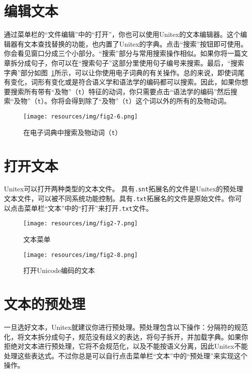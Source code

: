 \section{编辑文本}
通过菜单栏的“文件编辑”中的“打开”，你也可以使用Unitex的文本编辑器。这个编辑器有文本查找替换的功能，也内置了Unitex的字典。点击“搜索”按钮即可使用。你会看见窗口分成三个小部分。“搜索”部分与常用搜索操作相似。如果你将一篇文章拆分成句子，你可以在“搜索句子”这部分里使用句子编号来搜索。最后，“搜索字典”部分如图~\ref{dictionary-search}所示，可以让你使用电子词典的有关操作。总的来说，即使词尾有变化，词形有变化或是符合语义学和语法学的编码都可以搜索。因此，如果你想要搜索所有带有“及物”（\verb$t$）特征的动词，你只需要点击“语法学的编码”然后搜索“及物”（\verb$t$）。你将会得到除了“及物”（\verb$t$）这个词以外的所有的及物动词。


\begin{figure}[!h]
\begin{center}
\texttt{[image: resources/img/fig2-6.png]}
\caption{在电子词典中搜索及物动词（\texttt{t}）\label{dictionary-search}}
\end{center}
\end{figure}


\section{打开文本}
\noindent Unitex可以打开两种类型的文本文件。 
具有\verb+.snt+拓展名的文件是Unitex的预处理文本文件，可以被不同系统功能控制。具有\verb+.txt+拓展名的文件是原始文件。你可以点击菜单栏“文本”中的“打开”来打开\verb+.txt+文件。


\begin{figure}[!h]
\begin{center}
\texttt{[image: resources/img/fig2-7.png]}
\caption{文本菜单}
\end{center}
\end{figure}

\begin{figure}[!h]
\begin{center}
\texttt{[image: resources/img/fig2-8.png]}
\caption{打开Unicode编码的文本}
\end{center}
\end{figure}



\section{文本的预处理}
\noindent 一旦选好文本，Unitex就建议你进行预处理。预处理包含以下操作：分隔符的规范化，将文本拆分成句子，规范没有歧义的表达，将句子拆开，并加载字典。如果你拒绝对文本进行预处理，它将不会规范化，以及不能按语义分离，因此Unitex不能处理这些表达式。不过你总是可以自行点击菜单栏“文本”中的“预处理”来实现这个操作。


